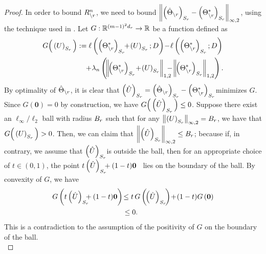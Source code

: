 \begin{proof}
\noindent In order to bound $R^n_{\backslash r}$, we need to bound \footnotesize $\left\|\left(\hat{\Theta}_{\backslash r}\right)_{S_{r}}-\left(\Theta^*_{\backslash r}\right)_{S_{r}}\right\|_{\infty,2}$\normalsize, using the technique used in \citet{Rothman08}. Let $G:\mathbb{R}^{(m-1)^2d_{r}}\rightarrow\mathbb{R}$ be a function defined as\footnotesize
\begin{equation}
\begin{aligned}
G\Big(\left(U\right)_{\support_\svert}\Big) &:=\ell\left(\left(\Theta^*_{\backslash\svert}\right)_{\support_\svert}\!\!+\!\left(U\right)_{\support_\svert};D\right) \!-\!\ell\left(\left(\Theta^*_{\backslash\svert}\right)_{\support_\svert};D\right)\\ &\quad+\!\regpar_n\left(\!\norm{\!\left(\Theta^*_{\backslash\svert}\right)_{\support_\svert} \!+\!\left(U\right)_{\support_\svert}}{1,2} \!\!\!\!\!-\!\norm{\!\left(\Theta^*_{\backslash\svert}\right)_{\support_\svert}}{1,2}\right).
\end{aligned}
\nonumber
\end{equation}\normalsize
By optimality of $\hat{\Theta}_{\backslash r}$, it is clear that \footnotesize $\left(\hat{U}\right)_{S_{r}} =\left(\hat{\Theta}_{\backslash r}\right)_{S_{r}} -\left(\Theta^*_{\backslash r}\right)_{S_{r}}$\normalsize minimizes $G$. Since $G(\mathbf{0})=0$ by construction, we have \footnotesize$G\Big(\left(\hat{U}\right)_{S_{r}}\Big)\leq 0$\normalsize. Suppose there exist an $\ell_\infty/\ell_2$ ball with radius $B_{r}$ such that for any \footnotesize$\left\|\left(U\right)_{S_{r}}\right\|_{\infty,2}=B_{r}$\normalsize, we have that $G\Big(\left(U\right)_{S_{r}}\Big)>0$. Then, we can claim that $\left\|\left(\hat{U}\right)_{S_{r}}\right\|_{\infty,2}\leq B_{r}$; because if, in contrary, we assume that \footnotesize$\left(\hat{U}\right)_{S_{r}}$\normalsize is outside the ball, then for an appropriate choice of $t\in(0,1)$, the point $t\left(\hat{U}\right)_{S_{r}}\!\!\!+(1-t)\mathbf{0}\,\,\,$ lies on the boundary of the ball. By convexity of $G$, we have
\begin{equation}
\begin{aligned}
G\left(t\left(\hat{U}\right)_{\support_\svert}\!\!\!\!+(1-t)\mathbf{0}\right)&\!\leq t\,G\left(\!\left(\hat{U}\right)_{\support_\svert}\!\right)\!+\!(1-t)G\left(\mathbf{0}\right)\\ &\leq 0.
\end{aligned}
\nonumber
\end{equation}
This is a contradiction to the assumption of the positivity of $G$ on the boundary of the ball.\\


\end{proof}
